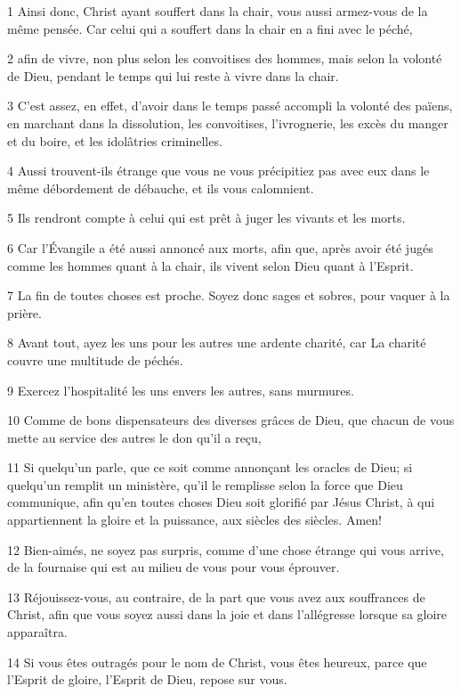 \par 1 Ainsi donc, Christ ayant souffert dans la chair, vous aussi armez-vous de la même pensée. Car celui qui a souffert dans la chair en a fini avec le péché,
\par 2 afin de vivre, non plus selon les convoitises des hommes, mais selon la volonté de Dieu, pendant le temps qui lui reste à vivre dans la chair.
\par 3 C'est assez, en effet, d'avoir dans le temps passé accompli la volonté des païens, en marchant dans la dissolution, les convoitises, l'ivrognerie, les excès du manger et du boire, et les idolâtries criminelles.
\par 4 Aussi trouvent-ils étrange que vous ne vous précipitiez pas avec eux dans le même débordement de débauche, et ils vous calomnient.
\par 5 Ils rendront compte à celui qui est prêt à juger les vivants et les morts.
\par 6 Car l'Évangile a été aussi annoncé aux morts, afin que, après avoir été jugés comme les hommes quant à la chair, ils vivent selon Dieu quant à l'Esprit.
\par 7 La fin de toutes choses est proche. Soyez donc sages et sobres, pour vaquer à la prière.
\par 8 Avant tout, ayez les uns pour les autres une ardente charité, car La charité couvre une multitude de péchés.
\par 9 Exercez l'hospitalité les uns envers les autres, sans murmures.
\par 10 Comme de bons dispensateurs des diverses grâces de Dieu, que chacun de vous mette au service des autres le don qu'il a reçu,
\par 11 Si quelqu'un parle, que ce soit comme annonçant les oracles de Dieu; si quelqu'un remplit un ministère, qu'il le remplisse selon la force que Dieu communique, afin qu'en toutes choses Dieu soit glorifié par Jésus Christ, à qui appartiennent la gloire et la puissance, aux siècles des siècles. Amen!
\par 12 Bien-aimés, ne soyez pas surpris, comme d'une chose étrange qui vous arrive, de la fournaise qui est au milieu de vous pour vous éprouver.
\par 13 Réjouissez-vous, au contraire, de la part que vous avez aux souffrances de Christ, afin que vous soyez aussi dans la joie et dans l'allégresse lorsque sa gloire apparaîtra.
\par 14 Si vous êtes outragés pour le nom de Christ, vous êtes heureux, parce que l'Esprit de gloire, l'Esprit de Dieu, repose sur vous.
